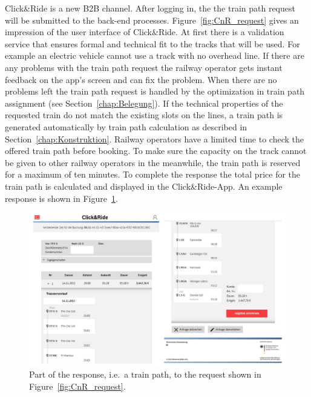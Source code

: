Click\&Ride is a new B2B channel. After logging in, the the train path request will be submitted to the back-end processes. Figure~\ref{fig:CnR_request} gives an impression of the user interface of Click\&Ride.
At first there is a validation service that ensures formal and technical fit to the tracks that will be used. For example an electric vehicle cannot use a track with no overhead line. If there are any problems with the train path request the railway operator gets instant feedback on the app's screen and can fix the problem. When there are no problems left the train path request is handled by the optimization in train path assignment (see Section~\ref{chap:Belegung}). If the technical properties of the requested train do not match the existing slots on the lines, a train path is generated automatically by train path calculation as described in Section~\ref{chap:Konstruktion}. Railway operators have a limited time to check the offered train path before booking. To make sure the capacity on the track cannot be given to other railway operators in the meanwhile, the train path is reserved for a maximum of ten minutes. To complete the response the total price for the train path is calculated and displayed in the Click\&Ride-App. An example response is shown in Figure~\ref{fig:CnR_response}.
\begin{figure}[htb]
	\centering
	\includegraphics[width=\textwidth]{Bilder/response.jpg}
	\caption{Part of the response, i.e.\ a train path, to the request shown in Figure~\ref{fig:CnR_request}.}
	\label{fig:CnR_response}
\end{figure}

